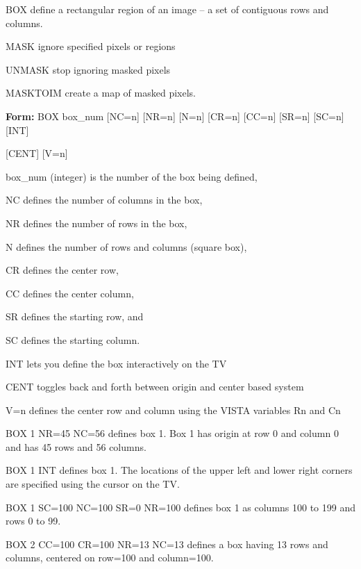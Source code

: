{\newpage\clearpage
{}%
\begin{example}
  \item[BOX\hfill]{define a rectangular region of an image --
       a set of contiguous rows and columns.}
  \item[MASK\hfill]{ignore specified pixels or regions}
  \item[UNMASK\hfill]{stop ignoring masked pixels}
  \item[MASKTOIM\hfill]{create a map of masked pixels.}
\end{example}%
\lthtmlfigureZ
\lthtmlcheckvsize\clearpage}

{\newpage\clearpage
{}%
\begin{command}
  \item[\textbf{Form:}  BOX box\_num {[NC=n]} {[NR=n]} {[N=n]} {[CR=n]} 
       {[CC=n]} {[SR=n]} {[SC=n]} {[INT]}\hfill]{}
  \item{   {[CENT]} {[V=n]}}
  \item[box\_num]{(integer) is the number of the box being defined,}
  \item[NC]{defines the number of columns in the box,}
  \item[NR]{defines the number of rows in the box,}
  \item[N  ]{ defines the number of rows and columns (square box),}
  \item[CR]{defines the center row,}
  \item[CC]{defines the center column,}
  \item[SR]{defines the starting row, and}
  \item[SC]{defines the starting column.}
  \item[INT]{lets you define the box interactively on the TV}
  \item[CENT]{toggles back and forth between origin and center based system}
  \item[V=n  ]{defines the center row and column using the
       VISTA variables Rn and Cn}
\end{command}%
\lthtmlfigureZ
\lthtmlcheckvsize\clearpage}

{\newpage\clearpage
{}%
\begin{example}
  \item[BOX 1 NR=45 NC=56\hfill]{defines box 1.  Box 1 has origin at row 0 and 
       column 0 and has 45 rows and 56 columns.}
  \item[BOX 1 INT\hfill]{defines box 1. The locations of the upper left and 
       lower right corners are specified using the cursor on the TV.}
  \item[BOX 1 SC=100 NC=100 SR=0 NR=100\hfill]{defines box 1 as columns
       100 to 199 and rows 0 to 99.}
  \item[BOX 2 CC=100 CR=100 NR=13 NC=13\hfill]{    defines a box having 13 rows
       and columns, centered on row=100 and column=100.}
\end{example}%
\lthtmlfigureZ
\lthtmlcheckvsize\clearpage}

